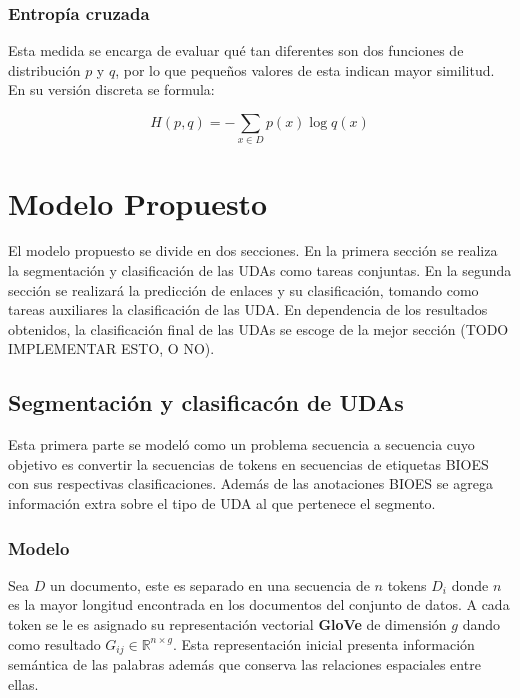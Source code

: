 \subsubsection{Entropía cruzada}

Esta medida se encarga de evaluar qué tan diferentes son dos funciones de distribución $p$ y $q$, por lo que
pequeños valores de esta indican mayor similitud. En su versión discreta se formula:

\begin{equation}
	H(p, q) = - \sum_{x \in D} p(x) \log q(x)
\end{equation}

\section{Modelo Propuesto}

El modelo propuesto se divide en dos secciones. En la primera sección se realiza la segmentación y clasificación de 
las UDAs como tareas conjuntas. En la segunda sección se realizará la predicción de enlaces y su clasificación, tomando
como tareas auxiliares la clasificación de las UDA. En dependencia de los resultados obtenidos, la clasificación final de 
las UDAs se escoge de la mejor sección (TODO IMPLEMENTAR ESTO, O NO). 

\subsection{Segmentación y clasificacón de UDAs}

Esta primera parte se modeló como un problema secuencia a secuencia cuyo objetivo es convertir la secuencias de 
tokens en secuencias de etiquetas BIOES con sus respectivas clasificaciones. Además de las 
anotaciones BIOES se agrega información extra sobre el tipo de UDA al que pertenece el segmento.

\subsubsection{Modelo}

Sea $D$ un documento, este es separado en una secuencia de $n$ tokens $D_i$ donde $n$ es la mayor longitud encontrada
en los documentos del conjunto de datos. A cada token se le es asignado
su representación vectorial \textbf{GloVe} de dimensión $g$ dando como resultado $G_{ij} \in \mathbb{R}^{n \times g}$.
Esta representación inicial presenta información semántica de las palabras además que conserva las relaciones 
espaciales entre ellas. 

